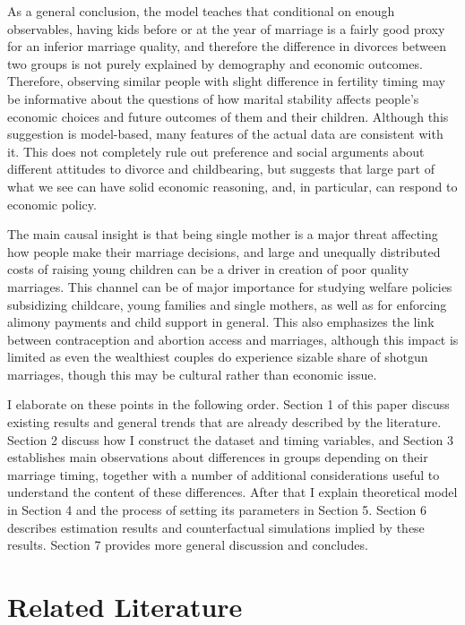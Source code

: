 \documentclass[12pt,letter]{article}
\begin{document}
As a general conclusion, the model teaches that conditional on enough observables, having kids before or at the year of marriage is a fairly good proxy for an inferior marriage quality, and therefore the difference in divorces between two groups is not purely explained by demography and economic outcomes. Therefore, observing similar people with slight difference in fertility timing may be informative about the questions of how marital stability affects people's economic choices and future outcomes of them and their children. Although this suggestion is model-based, many features of the actual data are consistent with it. This does not completely rule out preference and social arguments about different attitudes to divorce and childbearing, but suggests that large part of what we see can have solid economic reasoning, and, in particular, can respond to economic policy. 

The main causal insight is that being single mother is a major threat affecting how people make their marriage decisions, and large and unequally distributed costs of raising young children can be a driver in creation of poor quality marriages. This channel can be of major importance for studying welfare policies subsidizing childcare, young families and single mothers, as well as for enforcing alimony payments and child support in general. This also emphasizes the link between contraception and abortion access and marriages, although this impact is limited as even the wealthiest couples do experience sizable share of shotgun marriages, though this may be cultural rather than economic issue.

I elaborate on these points in the following order. Section 1 of this paper discuss existing results and general trends that are already described by the literature. Section 2 discuss how I construct the dataset and timing variables, and Section 3 establishes main observations about differences in groups depending on their marriage timing, together with a number of additional considerations useful to understand the content of these differences. After that I explain theoretical model in Section 4 and the process of setting its parameters in Section 5. Section 6 describes estimation results and counterfactual simulations implied by these results. Section 7 provides more general discussion and concludes.

\section{Related Literature}
\end{document}
